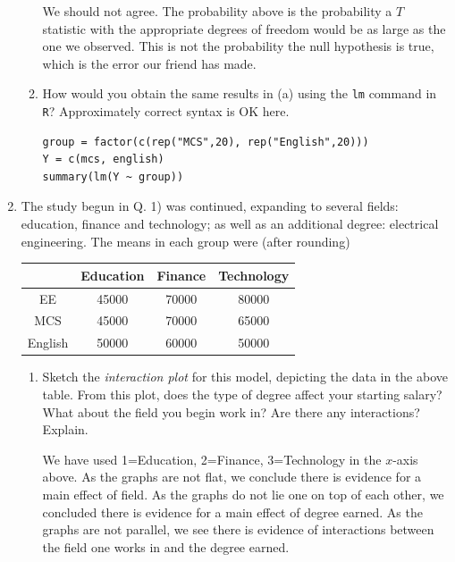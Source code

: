 \documentclass{article}
\begin{document}
\begin{enumerate}
\begin{enumerate}
{\color{red}
We should not agree. The probability above is the probability a $T$ statistic with
the appropriate degrees of freedom would be as large as the one we observed. This is
not the probability the null hypothesis is true, which is the error our friend has made.
}


\vspace{2in}

\item How would you obtain the same results in (a) using the {\tt lm} command in {\tt R}? {\sc Approximately
correct syntax is OK here.}

\vspace{2in}

{\color{red}
\begin{verbatim}
group = factor(c(rep("MCS",20), rep("English",20)))
Y = c(mcs, english)
summary(lm(Y ~ group))
\end{verbatim}
}

\end{enumerate}
\newpage 

\item 
The study begun in Q. 1) was continued, expanding to several fields:
education, finance and technology; as well as an additional
degree: electrical engineering.   The means in each group were (after rounding)
\begin{center}
\begin{tabular}{|c|c|c|c|} \hline 
& Education & Finance & Technology \\ \hline
EE & 45000 & 70000 & 80000 \\
MCS & 45000 & 70000 & 65000 \\
English & 50000 & 60000 & 50000 \\ \hline
\end{tabular}
\end{center}

\begin{enumerate}
\item Sketch the {\em interaction plot} for this model, depicting the data in the above table.
From this plot, does the type of degree affect your starting salary? What about the field you begin work in? Are there any interactions? Explain.

\begin{figure}
\centering
{}
\end{figure}

{\color{red}

We have used 1=Education, 2=Finance, 3=Technology in the $x$-axis above. 
As the graphs are not flat, we conclude there is evidence for a main effect of field.
As the graphs do not lie one on top of each other, we concluded there is evidence
for a main effect of degree earned.
As the graphs
are not parallel, we see there is evidence of interactions between
the field one works in and the degree earned.
}


\end{enumerate}
\end{enumerate}
\end{document}
